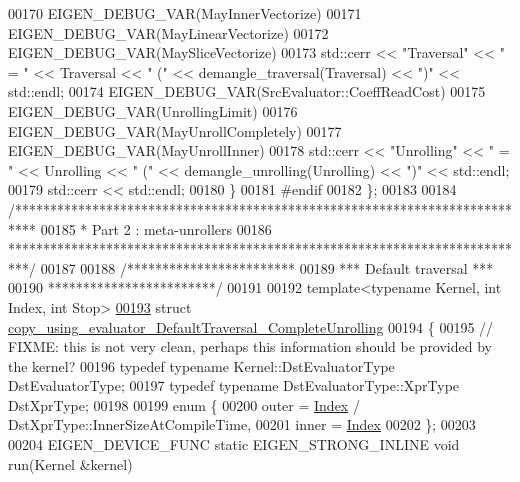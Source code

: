 \begin{DoxyCode}
00170     EIGEN\_DEBUG\_VAR(MayInnerVectorize)
00171     EIGEN\_DEBUG\_VAR(MayLinearVectorize)
00172     EIGEN\_DEBUG\_VAR(MaySliceVectorize)
00173     std::cerr << \textcolor{stringliteral}{"Traversal"} << \textcolor{stringliteral}{" = "} << Traversal << \textcolor{stringliteral}{" ("} << demangle\_traversal(Traversal) << \textcolor{stringliteral}{")"} << 
      std::endl;
00174     EIGEN\_DEBUG\_VAR(SrcEvaluator::CoeffReadCost)
00175     EIGEN\_DEBUG\_VAR(UnrollingLimit)
00176     EIGEN\_DEBUG\_VAR(MayUnrollCompletely)
00177     EIGEN\_DEBUG\_VAR(MayUnrollInner)
00178     std::cerr << \textcolor{stringliteral}{"Unrolling"} << \textcolor{stringliteral}{" = "} << Unrolling << \textcolor{stringliteral}{" ("} << demangle\_unrolling(Unrolling) << \textcolor{stringliteral}{")"} << 
      std::endl;
00179     std::cerr << std::endl;
00180   \}
00181 \textcolor{preprocessor}{#endif}
00182 \};
00183 
00184 \textcolor{comment}{/***************************************************************************}
00185 \textcolor{comment}{* Part 2 : meta-unrollers}
00186 \textcolor{comment}{***************************************************************************/}
00187 
00188 \textcolor{comment}{/************************}
00189 \textcolor{comment}{*** Default traversal ***}
00190 \textcolor{comment}{************************/}
00191 
00192 \textcolor{keyword}{template}<\textcolor{keyword}{typename} Kernel, \textcolor{keywordtype}{int} Index, \textcolor{keywordtype}{int} Stop>
\hyperlink{struct_eigen_1_1internal_1_1copy__using__evaluator___default_traversal___complete_unrolling}{00193} \textcolor{keyword}{struct }\hyperlink{struct_eigen_1_1internal_1_1copy__using__evaluator___default_traversal___complete_unrolling}{copy\_using\_evaluator\_DefaultTraversal\_CompleteUnrolling}
00194 \{
00195   \textcolor{comment}{// FIXME: this is not very clean, perhaps this information should be provided by the kernel?}
00196   \textcolor{keyword}{typedef} \textcolor{keyword}{typename} Kernel::DstEvaluatorType DstEvaluatorType;
00197   \textcolor{keyword}{typedef} \textcolor{keyword}{typename} DstEvaluatorType::XprType DstXprType;
00198   
00199   \textcolor{keyword}{enum} \{
00200     outer = \hyperlink{namespace_eigen_a62e77e0933482dafde8fe197d9a2cfde}{Index} / DstXprType::InnerSizeAtCompileTime,
00201     inner = \hyperlink{namespace_eigen_a62e77e0933482dafde8fe197d9a2cfde}{Index} %
00202   \};
00203 
00204   EIGEN\_DEVICE\_FUNC \textcolor{keyword}{static} EIGEN\_STRONG\_INLINE \textcolor{keywordtype}{void} run(Kernel &kernel)

\end{DoxyCode}

